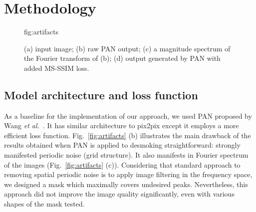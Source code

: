 \documentclass[pmlr]{jmlr}
\begin{document}
\section{Methodology}
\label{sec:method}

\begin{figure}[b!]
\floatconts
{fig:artifacts}
{\caption{(a) input image; (b) raw PAN output; (c) a magnitude spectrum of the Fourier transform of (b); (d) output generated by PAN with added MS-SSIM loss.}}
{ \quad
{} 
 \quad
{}
}
\end{figure}

\subsection{Model architecture and loss function}
\label{subsec:metod}
As a baseline for the implementation of our approach, we used PAN proposed by Wang \textit{et al.}~\citep{wang2018perceptual}. It has similar architecture to pix2pix except it employs a more efficient loss function. Fig.~\ref{fig:artifacts} (b) illustrates the main drawback of the results obtained when PAN is applied to desmoking straightforward: strongly manifested periodic noise (grid structure). It also manifests in Fourier spectrum of the images (Fig.~\ref{fig:artifacts} (c)). Considering that standard approach to removing spatial periodic noise is to apply image filtering in the frequency space, we designed a mask which maximally covers undesired peaks. Nevertheless, this approach did not improve the image quality significantly, even with various shapes of the mask tested.
\end{document}
